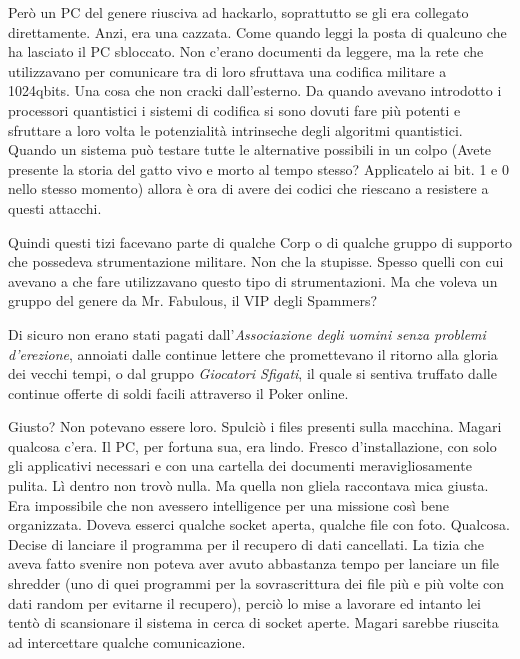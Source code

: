     Però un PC del genere riusciva ad hackarlo, soprattutto se gli era collegato direttamente. Anzi, era una cazzata.
    Come quando leggi la posta di qualcuno che ha lasciato il PC sbloccato. Non c'erano documenti da leggere, ma la rete
    che utilizzavano per comunicare tra di loro sfruttava una codifica militare a 1024qbits. Una cosa che non cracki
    dall'esterno. Da quando avevano introdotto i processori quantistici i sistemi di codifica si sono dovuti fare più
    potenti e sfruttare a loro volta le potenzialità intrinseche degli algoritmi quantistici. Quando un sistema può
    testare tutte le alternative possibili in un colpo (Avete presente la storia del gatto vivo e morto al tempo stesso?
    Applicatelo ai bit. 1 e 0 nello stesso momento) allora è ora di avere dei codici che riescano a resistere a questi
    attacchi.

    Quindi questi tizi facevano parte di qualche Corp o di qualche gruppo di supporto che possedeva strumentazione
    militare. Non che la stupisse. Spesso quelli con cui avevano a che fare utilizzavano questo tipo di strumentazioni.
    Ma che voleva un gruppo del genere da Mr. Fabulous, il VIP degli Spammers?

    Di sicuro non erano stati pagati dall'\emph{Associazione degli uomini senza problemi d'erezione}, annoiati dalle
    continue lettere che promettevano il ritorno alla gloria dei vecchi tempi, o dal gruppo \emph{Giocatori Sfigati},
    il quale si sentiva truffato dalle continue offerte di soldi facili attraverso il Poker online.

    Giusto? Non potevano essere loro. Spulciò i files presenti sulla macchina. Magari qualcosa c'era. Il PC, per fortuna
    sua, era lindo. Fresco d'installazione, con solo gli applicativi necessari e con una cartella dei documenti
    meravigliosamente pulita. Lì dentro non trovò nulla. Ma quella non gliela raccontava mica giusta. Era impossibile
    che non avessero intelligence per una missione così bene organizzata. Doveva esserci qualche socket aperta, qualche
    file con foto. Qualcosa. Decise di lanciare il programma per il recupero di dati cancellati. La tizia che aveva
    fatto svenire non poteva aver avuto abbastanza tempo per lanciare un file shredder (uno di quei programmi per
    la sovrascrittura dei file più e più volte con dati random per evitarne il recupero), perciò lo mise a lavorare ed
    intanto lei tentò di scansionare il sistema in cerca di socket aperte. Magari sarebbe riuscita ad intercettare
    qualche comunicazione.

